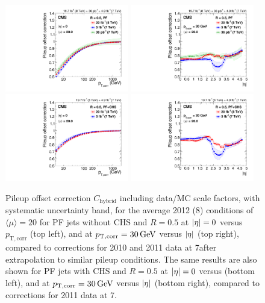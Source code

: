 \documentclass[11pt,twoside,a4paper,cmspaper,final,collab]{cms-tdr}
\begin{document}
\begin{figure}[htbp!]
\centering
\includegraphics[width=0.48\textwidth]{Figure_009-a.pdf}
\includegraphics[width=0.48\textwidth]{Figure_009-b.pdf}
\includegraphics[width=0.48\textwidth]{Figure_009-c.pdf}
\includegraphics[width=0.48\textwidth]{Figure_009-d.pdf}
\caption{\label{fig:l1corrections}
Pileup offset correction $C_\text{hybrid}$ including data/MC scale factors, with systematic uncertainty band, for the average 2012 (8\TeV) conditions of $\langle\mu\rangle=20$ for PF jets without CHS and $R=0.5$ at $\lvert \eta \rvert=0$ versus $p_\mathrm{T, corr}$ (top left), and at $p_{\mathrm{T},\rm corr}=30\,\text{Ge\hspace{-.08em}V}$ versus $\lvert \eta \rvert$ (top right),
compared to corrections for 2010 \cite{JEC_JINST} and 2011 \cite{CMS-DP-2012-006} data at 7\TeV after extrapolation to similar pileup conditions.
The same results are also shown for PF jets with CHS and $R=0.5$ at $\lvert \eta \rvert=0$ versus \pt (bottom left), and at $p_{\mathrm{T},\rm corr}=30\,\text{Ge\hspace{-.08em}V}$ versus $\lvert \eta \rvert$ (bottom right), compared to corrections for 2011 data at 7\TeV \cite{CMS-DP-2012-006}.
}
\end{figure}
\end{document}
